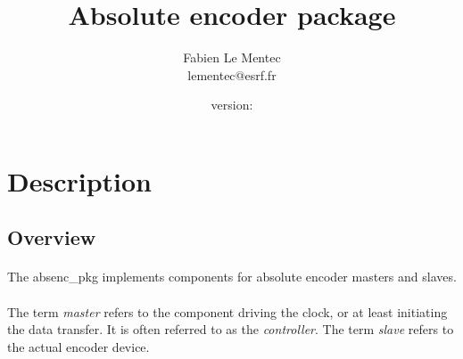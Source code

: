 \documentclass[12pt]{article}
\begin{document}

\newcommand{\todo}[1]
{\paragraph{}\textbf{TODO}: #1}

{\lstset{language=VHDL, basicstyle=\tiny, frame=single}}{}

{\lstset{frame=single}}{}

\newcommand{\longurl}[2]
{\url{#1#2}}

\newcommand{\longlongurl}[3]
{\url{#1#2#3}}

{}{\newcommand{\version}{none}}





\title{Absolute encoder package}
\author{Fabien Le Mentec \\ lementec@esrf.fr}
\date{\small{version: \version}}
\maketitle


\newpage
\setcounter{tocdepth}{2}
\tableofcontents


\newpage
\section{Description}

\subsection{Overview}
\paragraph{}
The absenc\_pkg implements components for absolute encoder masters and
slaves.

\paragraph{}
The term \textit{master} refers to the component driving the clock, or at
least initiating the data transfer. It is often referred to as the
\textit{controller}. The term \textit{slave} refers to the actual encoder
device.
\end{document}
